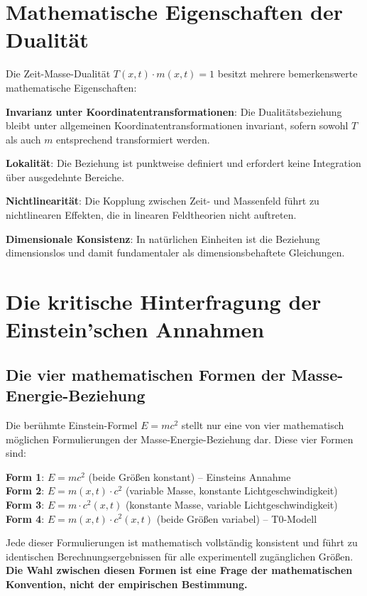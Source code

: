 \documentclass[12pt,a4paper]{report}
\begin{document}
	\section{Mathematische Eigenschaften der Dualität}
	
	Die Zeit-Masse-Dualität $T(x,t) \cdot m(x,t) = 1$ besitzt mehrere bemerkenswerte mathematische Eigenschaften:
	
	\textbf{Invarianz unter Koordinatentransformationen}: Die Dualitätsbeziehung bleibt unter allgemeinen Koordinatentransformationen invariant, sofern sowohl $T$ als auch $m$ entsprechend transformiert werden.
	
	\textbf{Lokalität}: Die Beziehung ist punktweise definiert und erfordert keine Integration über ausgedehnte Bereiche.
	
	\textbf{Nichtlinearität}: Die Kopplung zwischen Zeit- und Massenfeld führt zu nichtlinearen Effekten, die in linearen Feldtheorien nicht auftreten.
	
	\textbf{Dimensionale Konsistenz}: In natürlichen Einheiten ist die Beziehung dimensionslos und damit fundamentaler als dimensionsbehaftete Gleichungen.
	
	\section{Die kritische Hinterfragung der Einstein'schen Annahmen}
	
	\subsection{Die vier mathematischen Formen der Masse-Energie-Beziehung}
	
	Die berühmte Einstein-Formel $E = mc^2$ stellt nur eine von vier mathematisch möglichen Formulierungen der Masse-Energie-Beziehung dar. Diese vier Formen sind:
	
	\textbf{Form 1}: $E = mc^2$ (beide Größen konstant) -- Einsteins Annahme\\
	\textbf{Form 2}: $E = m(x,t) \cdot c^2$ (variable Masse, konstante Lichtgeschwindigkeit)\\
	\textbf{Form 3}: $E = m \cdot c^2(x,t)$ (konstante Masse, variable Lichtgeschwindigkeit)\\
	\textbf{Form 4}: $E = m(x,t) \cdot c^2(x,t)$ (beide Größen variabel) -- T0-Modell
	
	Jede dieser Formulierungen ist mathematisch vollständig konsistent und führt zu identischen Berechnungsergebnissen für alle experimentell zugänglichen Größen. \textbf{Die Wahl zwischen diesen Formen ist eine Frage der mathematischen Konvention, nicht der empirischen Bestimmung.}
	
\end{document}
